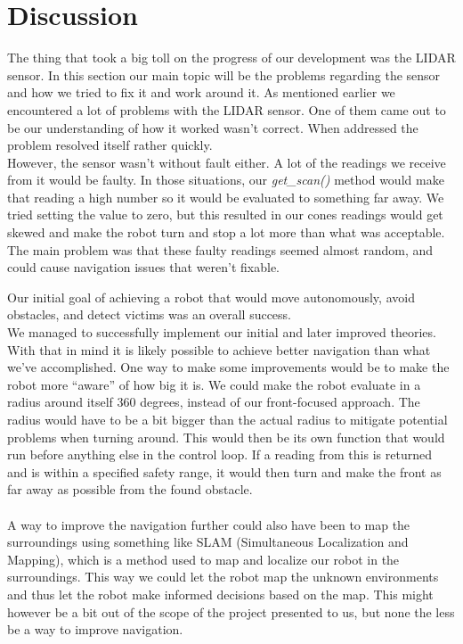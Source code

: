 \documentclass[conference]{IEEEtran}
\begin{document}
\section{Discussion}\label{discussion}
The thing that took a big toll on the progress of our development was the LIDAR sensor. 
In this section our main topic will be the problems regarding the sensor and how we tried to fix it and work around it. 
As mentioned earlier we encountered a lot of problems with the LIDAR sensor. 
One of them came out to be our understanding of how it worked wasn't correct. When addressed the problem resolved itself 
rather quickly. \\
However, the sensor wasn't without fault either. A lot of the readings we receive from it would be faulty. 
In those situations, our \textit{get\_scan()} method would make that reading a high number so it would be evaluated to 
something far away. We tried setting the value to zero, but this resulted in our cones readings would get skewed and 
make the robot turn and stop a lot more than what was acceptable. The main problem was that these faulty readings seemed 
almost random, and could cause navigation issues that weren't fixable.

Our initial goal of achieving a robot that would move autonomously, avoid obstacles, and detect 
victims was an overall success. \\
We managed to successfully implement our initial and later improved theories. 
With that in mind it is likely possible to achieve better navigation than what we've accomplished. 
One way to make some improvements would be to make the robot more “aware” of how big it is. We could make 
the robot evaluate in a radius around itself 360 degrees, instead of our front-focused approach. 
The radius would have to be a bit bigger than the actual radius to mitigate potential problems when turning around. 
This would then be its own function that would run before anything else in the control loop. 
If a reading from this is returned and is within a specified safety range, it would then turn and make the 
front as far away as possible from the found obstacle. \\\\
A way to improve the navigation further could also have been to map the surroundings using something like 
SLAM (Simultaneous Localization and Mapping), which is a method used to map and localize our robot in the surroundings. 
This way we could let the robot map the unknown environments and thus let the robot make informed decisions based on the map. 
This might however be a bit out of the scope of the project presented to us, but none the less be a way to improve navigation. 
\end{document}
